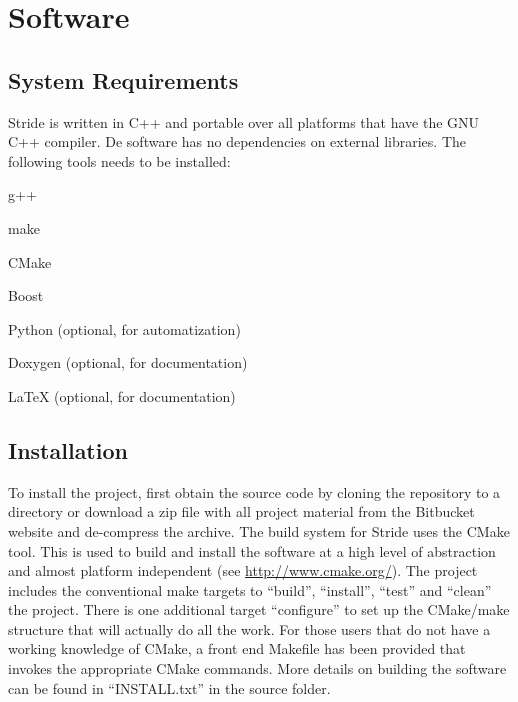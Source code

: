 \chapter{Software}
\label{chap:software}


\section{System Requirements}
\label{section:system}

Stride is written in C++ and portable over all platforms that have the GNU C++ compiler. 
De software has no dependencies on external libraries. The following tools needs to be installed:
\begin{compactitem}
    \item g++
    \item make
    \item CMake
    \item Boost
    \item Python (optional, for automatization)
    \item Doxygen (optional, for documentation)
    \item LaTeX (optional, for documentation)
\end{compactitem}


\section{Installation}
\label{section:Installation}

To install the project, first obtain the source code by cloning the repository to a directory or download a zip file with all project
material from the Bitbucket website and de-compress the archive. 
The build system for Stride uses the CMake tool. This is used to build and install the software at a high level of abstraction and almost platform independent (see \url{http://www.cmake.org/}). 
The project includes the conventional make targets to ``build'', ``install'', ``test'' and ``clean'' the project. There is one additional target ``configure'' to set up the CMake/make structure that will actually do all the work.
For those users that do not have a working knowledge of CMake, a front end Makefile has been provided that invokes the appropriate CMake commands.
More details on building the software can be found in ``INSTALL.txt'' in the source folder.


